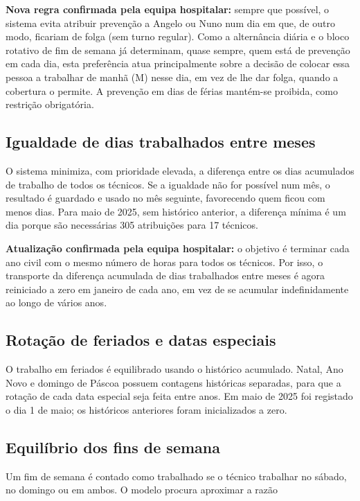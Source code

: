 \documentclass[11pt,a4paper]{article}
\begin{document}
\textbf{Nova regra confirmada pela equipa hospitalar:} sempre que possível, o
sistema evita atribuir prevenção a Angelo ou Nuno num dia em que, de outro
modo, ficariam de folga (sem turno regular). Como a alternância diária e o
bloco rotativo de fim de semana já determinam, quase sempre, quem está de
prevenção em cada dia, esta preferência atua principalmente sobre a decisão de
colocar essa pessoa a trabalhar de manhã (M) nesse dia, em vez de lhe dar
folga, quando a cobertura o permite. A prevenção em dias de férias mantém-se
proibida, como restrição obrigatória.

\subsection{Igualdade de dias trabalhados entre meses}

O sistema minimiza, com prioridade elevada, a diferença entre os dias acumulados
de trabalho de todos os técnicos. Se a igualdade não for possível num mês, o
resultado é guardado e usado no mês seguinte, favorecendo quem ficou com menos
dias. Para maio de 2025, sem histórico anterior, a diferença mínima é um dia
porque são necessárias 305 atribuições para 17 técnicos.

\textbf{Atualização confirmada pela equipa hospitalar:} o objetivo é terminar
cada ano civil com o mesmo número de horas para todos os técnicos. Por isso, o
transporte da diferença acumulada de dias trabalhados entre meses é agora
reiniciado a zero em janeiro de cada ano, em vez de se acumular indefinidamente
ao longo de vários anos.

\subsection{Rotação de feriados e datas especiais}

O trabalho em feriados é equilibrado usando o histórico acumulado. Natal, Ano
Novo e domingo de Páscoa possuem contagens históricas separadas, para que a
rotação de cada data especial seja feita entre anos. Em maio de 2025 foi
registado o dia 1 de maio; os históricos anteriores foram inicializados a zero.

\subsection{Equilíbrio dos fins de semana}

Um fim de semana é contado como trabalhado se o técnico trabalhar no sábado,
no domingo ou em ambos. O modelo procura aproximar a razão
\end{document}
